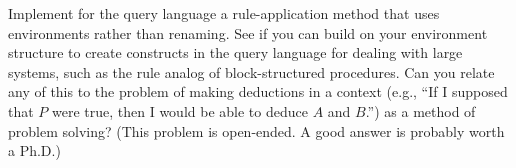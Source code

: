 \begin{exerciseGroup}
Implement for the query language a rule-application method that uses
environments rather than renaming.  See if you can build on your environment
structure to create constructs in the query language for dealing with large
systems, such as the rule analog of block-structured procedures.  Can you
relate any of this to the problem of making deductions in a context (e.g., ``If
I supposed that \( P \) were true, then I would be able to deduce \( A \) and
\( B \).'') as a method of problem solving?  (This problem is open-ended.  A good
answer is probably worth a Ph.D.)
\end{exerciseGroup}
